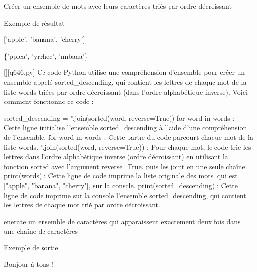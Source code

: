         \question
        Créer un ensemble de mots avec leurs caractères triés par ordre décroissant

Exemple de résultat

['apple', 'banana', 'cherry']

\{'pplea', 'yrrhec', 'nnbaaa'\}
        \par
        \begin{solution}
            \renewcommand{\nomfichier}{q646.py}
            \pythonfile{\chemincode \nomfichier}[][\nomfichier]
            Ce code Python utilise une compréhension d'ensemble pour créer un ensemble appelé sorted_descending, qui contient les lettres de chaque mot de la liste words triées par ordre décroissant (dans l'ordre alphabétique inverse). Voici comment fonctionne ce code :

    sorted_descending = {''.join(sorted(word, reverse=True)) for word in words} : Cette ligne initialise l'ensemble sorted_descending à l'aide d'une compréhension de l'ensemble.
        for word in words : Cette partie du code parcourt chaque mot de la liste words.
        ''.join(sorted(word, reverse=True)) : Pour chaque mot, le code trie les lettres dans l'ordre alphabétique inverse (ordre décroissant) en utilisant la fonction sorted avec l'argument reverse=True, puis les joint en une seule chaîne.
    print(words) : Cette ligne de code imprime la liste originale des mots, qui est ["apple", "banana", "cherry"], sur la console.
    print(sorted_descending) : Cette ligne de code imprime sur la console l'ensemble sorted_descending, qui contient les lettres de chaque mot trié par ordre décroissant.
        \end{solution}
        

        \question
        enerate un ensemble de caractères qui apparaissent exactement deux fois dans une chaîne de caractères

Exemple de sortie

Bonjour à tous !

